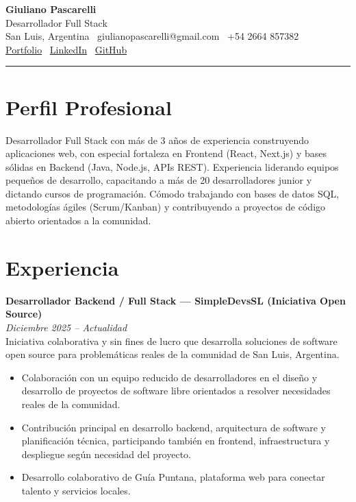 \documentclass[10pt,a4paper]{article}
\newcommand{\entryheader}[2]{\textbf{#1}\\ \textit{#2}\\[1pt]}
\begin{document}
\pagestyle{empty}

\begin{center}
    {\LARGE \textbf{Giuliano Pascarelli}}\\
    \vspace{2pt}
    {\normalsize Desarrollador Full Stack}\\
    \vspace{1.5pt}
    \small
    San Luis, Argentina \textbullet\ giulianopascarelli@gmail.com \textbullet\ +54 2664 857382\\
    \href{https://lelox028.github.io/}{Portfolio} \textbullet\
    \href{https://www.linkedin.com/in/giuliano-pascarelli-097100190/}{LinkedIn} \textbullet\
    \href{https://github.com/lelox028}{GitHub}
\end{center}

\vspace{2pt}
\hrule

\section*{Perfil Profesional}
Desarrollador Full Stack con más de 3 años de experiencia construyendo aplicaciones web, con especial fortaleza en Frontend (React, Next.js) y bases sólidas en Backend (Java, Node.js, APIs REST). Experiencia liderando equipos pequeños de desarrollo, capacitando a más de 20 desarrolladores junior y dictando cursos de programación. Cómodo trabajando con bases de datos SQL, metodologías ágiles (Scrum/Kanban) y contribuyendo a proyectos de código abierto orientados a la comunidad.

\section*{Experiencia}

\entryheader{Desarrollador Backend / Full Stack --- SimpleDevsSL (Iniciativa Open Source)}{Diciembre 2025 -- Actualidad}
Iniciativa colaborativa y sin fines de lucro que desarrolla soluciones de software open source para problemáticas reales de la comunidad de San Luis, Argentina.
\begin{itemize}[noitemsep, topsep=1pt, partopsep=0pt, leftmargin=16pt]
    \item Colaboración con un equipo reducido de desarrolladores en el diseño y desarrollo de proyectos de software libre orientados a resolver necesidades reales de la comunidad.
    \item Contribución principal en desarrollo backend, arquitectura de software y planificación técnica, participando también en frontend, infraestructura y despliegue según necesidad del proyecto.
    \item Desarrollo colaborativo de Guía Puntana, plataforma web para conectar talento y servicios locales.
\end{itemize}
\end{document}
